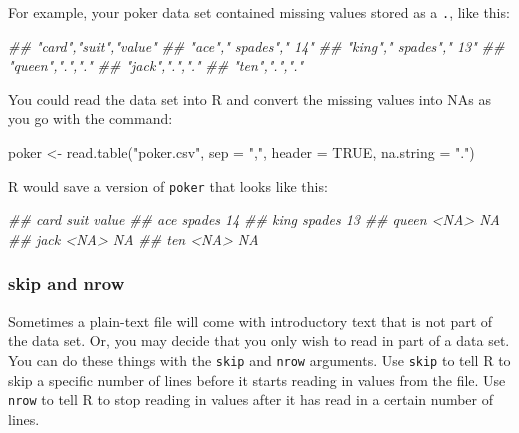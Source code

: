 \documentclass[
  letterpaper,
  DIV=11,
  numbers=noendperiod]{scrbook}
\newenvironment{Shaded}{\begin{snugshade}}{\end{snugshade}}
\newcommand{\AttributeTok}[1]{\textcolor[rgb]{0.40,0.45,0.13}{#1}}
\newcommand{\ConstantTok}[1]{\textcolor[rgb]{0.56,0.35,0.01}{#1}}
\newcommand{\DocumentationTok}[1]{\textcolor[rgb]{0.37,0.37,0.37}{\textit{#1}}}
\newcommand{\FunctionTok}[1]{\textcolor[rgb]{0.28,0.35,0.67}{#1}}
\newcommand{\NormalTok}[1]{\textcolor[rgb]{0.00,0.23,0.31}{#1}}
\newcommand{\OtherTok}[1]{\textcolor[rgb]{0.00,0.23,0.31}{#1}}
\newcommand{\StringTok}[1]{\textcolor[rgb]{0.13,0.47,0.30}{#1}}
\begin{document}
For example, your poker data set contained missing values stored as a
\texttt{.}, like this:

\begin{Shaded}
\begin{Highlighting}[]
\DocumentationTok{\#\# "card","suit","value"}
\DocumentationTok{\#\# "ace"," spades"," 14"}
\DocumentationTok{\#\# "king"," spades"," 13"}
\DocumentationTok{\#\# "queen",".","."}
\DocumentationTok{\#\# "jack",".","."}
\DocumentationTok{\#\# "ten",".","."}
\end{Highlighting}
\end{Shaded}

You could read the data set into R and convert the missing values into
NAs as you go with the command:

\begin{Shaded}
\begin{Highlighting}[]
\NormalTok{poker }\OtherTok{\textless{}{-}} \FunctionTok{read.table}\NormalTok{(}\StringTok{"poker.csv"}\NormalTok{, }\AttributeTok{sep =} \StringTok{","}\NormalTok{, }\AttributeTok{header =} \ConstantTok{TRUE}\NormalTok{, }\AttributeTok{na.string =} \StringTok{"."}\NormalTok{)}
\end{Highlighting}
\end{Shaded}

R would save a version of \texttt{poker} that looks like this:

\begin{Shaded}
\begin{Highlighting}[]
\DocumentationTok{\#\#  card    suit value}
\DocumentationTok{\#\#   ace  spades    14}
\DocumentationTok{\#\#  king  spades    13}
\DocumentationTok{\#\# queen    \textless{}NA\textgreater{}    NA}
\DocumentationTok{\#\#  jack    \textless{}NA\textgreater{}    NA}
\DocumentationTok{\#\#   ten    \textless{}NA\textgreater{}    NA}
\end{Highlighting}
\end{Shaded}

\subsubsection{skip and nrow}\label{skip-and-nrow}

Sometimes a plain-text file will come with introductory text that is not
part of the data set. Or, you may decide that you only wish to read in
part of a data set. You can do these things with the \texttt{skip} and
\texttt{nrow} arguments. Use \texttt{skip} to tell R to skip a specific
number of lines before it starts reading in values from the file. Use
\texttt{nrow} to tell R to stop reading in values after it has read in a
certain number of lines.
\end{document}
